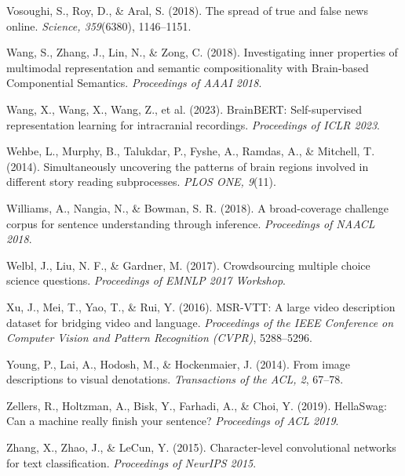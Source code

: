 \documentclass[11pt,letterpaper]{article}
\begin{document}
Vosoughi, S., Roy, D., \& Aral, S. (2018). The spread of true and false news online. \textit{Science, 359}(6380), 1146--1151.

Wang, S., Zhang, J., Lin, N., \& Zong, C. (2018). Investigating inner properties of multimodal representation and semantic compositionality with Brain-based Componential Semantics. \textit{Proceedings of AAAI 2018}.

Wang, X., Wang, X., Wang, Z., et al. (2023). BrainBERT: Self-supervised representation learning for intracranial recordings. \textit{Proceedings of ICLR 2023}.

Wehbe, L., Murphy, B., Talukdar, P., Fyshe, A., Ramdas, A., \& Mitchell, T. (2014). Simultaneously uncovering the patterns of brain regions involved in different story reading subprocesses. \textit{PLOS ONE, 9}(11).

Williams, A., Nangia, N., \& Bowman, S. R. (2018). A broad-coverage challenge corpus for sentence understanding through inference. \textit{Proceedings of NAACL 2018}.

Welbl, J., Liu, N. F., \& Gardner, M. (2017). Crowdsourcing multiple choice science questions. \textit{Proceedings of EMNLP 2017 Workshop}.

Xu, J., Mei, T., Yao, T., \& Rui, Y. (2016). MSR-VTT: A large video description dataset for bridging video and language. \textit{Proceedings of the IEEE Conference on Computer Vision and Pattern Recognition (CVPR)}, 5288--5296.

Young, P., Lai, A., Hodosh, M., \& Hockenmaier, J. (2014). From image descriptions to visual denotations. \textit{Transactions of the ACL, 2}, 67--78.

Zellers, R., Holtzman, A., Bisk, Y., Farhadi, A., \& Choi, Y. (2019). HellaSwag: Can a machine really finish your sentence? \textit{Proceedings of ACL 2019}.

Zhang, X., Zhao, J., \& LeCun, Y. (2015). Character-level convolutional networks for text classification. \textit{Proceedings of NeurIPS 2015}.
\end{document}
